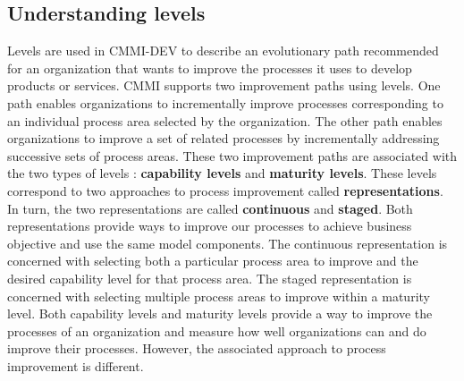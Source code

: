 \documentclass[11pt]{article}
\begin{document}
\subsection{Understanding levels}
Levels are used in CMMI-DEV to describe an evolutionary path recommended for an organization that wants to improve the processes it uses to develop products or services. CMMI supports two improvement paths using levels. One path enables organizations to incrementally improve processes corresponding to an individual process area selected by the organization. The other path enables organizations to improve a set of related processes by incrementally addressing successive sets of process areas. These two improvement paths are associated with the two types of levels : \textbf{capability levels} and \textbf{maturity levels}. These levels correspond to two approaches to process improvement called \textbf{representations}. In turn, the two representations are called \textbf{continuous} and \textbf{staged}. Both representations provide ways to improve our processes to achieve business objective and use the same model components. The continuous representation is concerned with selecting both a particular process area to improve and the desired capability level for that process area. The staged representation is concerned with selecting multiple process areas to improve within a maturity level. Both capability levels and maturity levels provide a way to improve the processes of an organization and measure how well organizations can and do improve their processes. However, the associated approach to process improvement is different.
\end{document}
